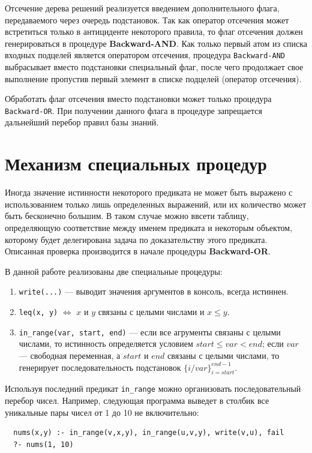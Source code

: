 Отсечение дерева решений реализуется введением дополнительного флага, передаваемого через очередь подстановок. Так как оператор отсечения может встретиться только в антициденте некоторого правила, то флаг отсечения должен генерироваться в процедуре \textbf{Backward-AND}. Как только первый атом из списка входных подцелей является оператором отсечения, процедура \texttt{Backward-AND} выбрасывает вместо подстановки специальный флаг, после чего продолжает свое выполнение пропустив первый элемент в списке подцелей (оператор отсечения).

Обработать флаг отсечения вместо подстановки может только процедура \texttt{Backward-OR}. При получении данного флага в процедуре запрещается дальнейший перебор правил базы знаний. 

\section{Механизм специальных процедур}

Иногда значение истинности некоторого предиката не может быть выражено с использованием только лишь определенных выражений, или их количество может быть бесконечно большим. В таком случае можно ввсети таблицу, определяющую соответствие между именем предиката и некоторым объектом, которому будет делегирована задача по доказательству этого предиката. Описанная проверка производится в начале процедуры \textbf{Backward-OR}.

В данной работе реализованы две специальные процедуры:
\begin{enumerate}
  \item \texttt{write(...)} --- выводит значения аргументов в консоль, всегда истиннен.
  \item \texttt{leq(x, y)} $\Leftrightarrow$ $x$ и $y$ связаны с целыми числами и $x \le y$.
  \item \texttt{in\_range(var, start, end)} --- если все агрументы связаны с целыми числами, то истинность определяется условием $start \le var < end$; если $var$ --- свободная переменная, а $start$ и $end$ связаны с целыми числами, то генерирует последовательность подстановок $\{i/var\}_{i=start}^{end-1}$.
\end{enumerate}

Используя последний предикат \texttt{in\_range} можно организовать последовательный перебор чисел. Например, следующая программа выведет в столбик все уникальные пары чисел от 1 до 10 не включительно:
\begin{verbatim}
  nums(x,y) :- in_range(v,x,y), in_range(u,v,y), write(v,u), fail
  ?- nums(1, 10)
\end{verbatim}

